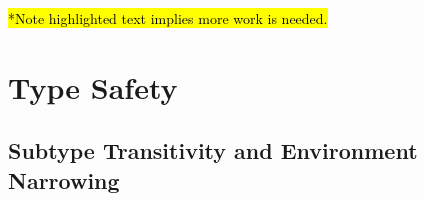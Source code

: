 \documentclass{llncs}
\begin{document}
\hl{*Note highlighted text implies more work is needed.}
\section{Type Safety}

\subsection{Subtype Transitivity and Environment Narrowing}




\end{document}
